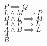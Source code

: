 \noindent 
\tab\tab\tab\tab\tab\tab$P\implies Q$\\[4pt]
\tab\tab\tab\tab\tab\tab$L\land M \implies P$\\[4pt]
\tab\tab\tab\tab\tab\tab$B \land L \implies M$\\[4pt]
\tab\tab\tab\tab\tab\tab$A \land P\implies L$\\[4pt]
\tab\tab\tab\tab\tab\tab$A \land B\implies L$\\[4pt]
\tab\tab\tab\tab\tab\tab$A$\\[4pt]
\tab\tab\tab\tab\tab\tab$B$
